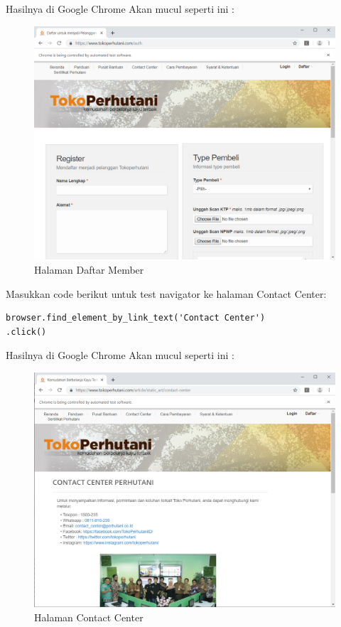 Hasilnya  di Google Chrome Akan mucul seperti ini :
\begin{figure}[h]
	\centering
	\includegraphics[scale=0.37]{figures/3daftar}
	\caption{Halaman Daftar Member}
\end{figure}

Masukkan code berikut untuk test navigator ke halaman Contact Center:
\begin{verbatim}
browser.find_element_by_link_text('Contact Center')
.click()
\end{verbatim}

Hasilnya  di Google Chrome Akan mucul seperti ini :
\begin{figure}[h]
	\centering
	\includegraphics[scale=0.3]{figures/4kontak}
	\caption{Halaman Contact Center}
\end{figure}

